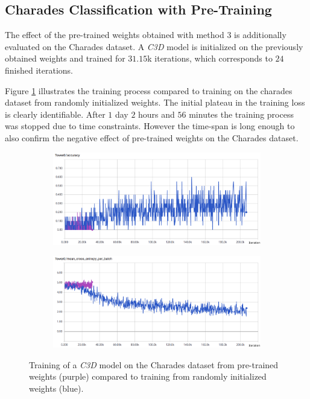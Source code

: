 \subsection{Charades Classification with Pre-Training}
The effect of the pre-trained weights obtained with method 3 is additionally evaluated on the Charades dataset.
A \textit{C3D} model is initialized on the previously obtained weights and trained for $31.15$k iterations, which corresponds to $24$ finished iterations.

Figure \ref{fig:pretrain3initializedcharades} illustrates the training process compared to training on the charades dataset from randomly initialized weights.
The initial plateau in the training loss is clearly identifiable.
After $1$ day $2$ hours and $56$ minutes the training process was stopped due to time constraints.
However the time-span is long enough to also confirm the negative effect of pre-trained weights on the Charades dataset.

\begin{figure}[H]
    \begin{subfigure}[c]{\textwidth}
    \centering
    \includegraphics[width=\textwidth]{img_evaluation/pretrain3_initialized_charades/tower0accuracy}
    \end{subfigure}
    \begin{subfigure}[c]{\textwidth}
    \includegraphics[width=\textwidth]{img_evaluation/pretrain3_initialized_charades/tower0crossentropy}
    \end{subfigure}
    \label{fig:pretrain3initializedcharades}
    \caption{Training of a \textit{C3D} model on the Charades dataset from pre-trained weights (purple) compared to training from randomly initialized weights (blue).}
\end{figure}

